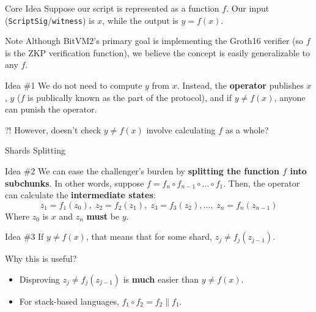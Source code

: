 \documentclass{zkdl-presentation-template}
\newcommand{\cmark}{\textcolor{green!65!black}{\ding{51}}}%
\begin{document}
    \begin{frame}{Core Idea}
        Suppose our script is represented as a function $f$. Our input (\texttt{ScriptSig}/\texttt{witness}) is $x$, while the output is $y=f(x)$.\pause

        \begin{block}{Note}
            Although BitVM2's primary goal is implementing the Groth16 verifier (so $f$ is the ZKP verification function), we believe the concept is easily generalizable to any $f$.\pause
        \end{block}
    
        \begin{block}{Idea \#1}
            We do not need to compute $y$ from $x$. Instead, the \textbf{operator} publishes $x$, $y$ ($f$ is publically known as the part of the protocol), and if $y \neq f(x)$, anyone can punish the operator.\pause
        \end{block}

        \begin{alertblock}{?!}
            However, doesn't check $y \neq f(x)$ involve calculating $f$ as a whole?
        \end{alertblock}
    \end{frame}

    \begin{frame}{Shards Splitting}
        \begin{block}{Idea \#2}
            We can ease the challenger's burden by \textbf{splitting the function $f$ into subchunks}. In other words, suppose $f=f_n \circ f_{n-1} \circ \dots \circ f_1$. Then, the operator can calculate the \textbf{intermediate states}:
            \begin{equation*}
                z_1 = f_1(z_0), \; z_2 = f_2(z_1), \; z_3 = f_3(z_2), \dots, \; z_n = f_n(z_{n-1})
            \end{equation*}
            Where $z_0$ is $x$ and $z_n$ \textbf{must} be $y$.\pause
        \end{block}

        \begin{block}{Idea \#3}
            If $y \neq f(x)$, that means that for some shard, $z_{j} \neq f_{j}(z_{j-1})$.\pause
        \end{block}

        \begin{block}{Why this is useful?}
            \begin{itemize}[label=\cmark]
                \item Disproving $z_j \neq f_j(z_{j-1})$ is \textbf{much} easier than $y \neq f(x)$.\pause
                \item For stack-based languages, $f_1 \circ f_2 = f_2 \parallel f_1$.
            \end{itemize}
        \end{block}
    \end{frame}
\end{document}
